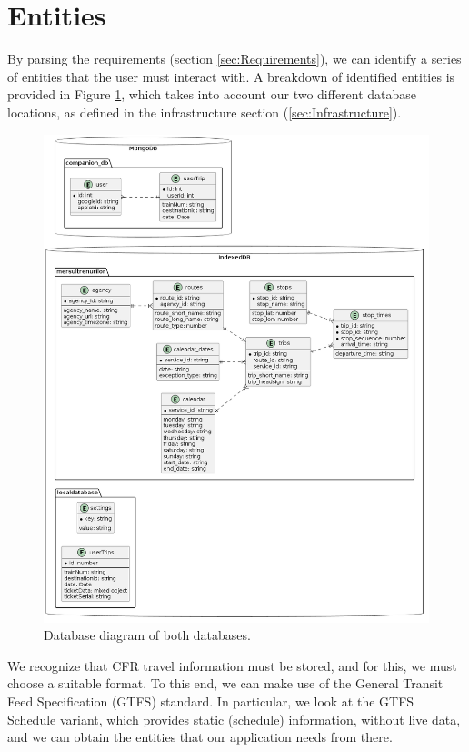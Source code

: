 \section{Entities}
\label{sec:Entities}
By parsing the requirements (section \ref{sec:Requirements}), we can identify a series of entities that the user must interact with. A breakdown of identified entities is provided in Figure \ref{FigDbDiagram}, which takes into account our two different database locations, as defined in the infrastructure section (\ref{sec:Infrastructure}).

\begin{figure}[htbp]
    \centering
    \includegraphics[width=1\textwidth]{./figures/ch3_db-diagram.png}
    \caption{Database diagram of both databases.}
    \label{FigDbDiagram}
\end{figure}

We recognize that CFR travel information must be stored, and for this, we must choose a suitable format. To this end, we can make use of the General Transit Feed Specification (GTFS) standard. In particular, we look at the GTFS Schedule variant, which provides static (schedule) information, without live data, and we can obtain the entities that our application needs from there.

